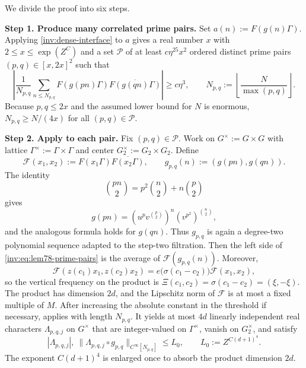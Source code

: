 \documentclass[twoside]{aomart}
\makeatletter
\theoremstyle{paperplain}
\theoremstyle{paperdefinition}
\renewenvironment{proof}[1][\proofname]{\par\pushQED{\qed}%
  \normalfont\topsep6\p@\@plus3\p@\relax\trivlist
  \item[\hskip\labelsep\itshape #1\@addpunct{.}]\ignorespaces
}{\popQED\endtrivlist\@endpefalse}
\numberwithin{equation}{section}
\makeatother
\begin{document}
\begin{proof}
We divide the proof into six steps.	
	
\par
\medskip
\noindent\textbf{Step 1. Produce many correlated prime pairs.}
Set $a(n):=F(g(n)\Gamma)$. Applying
\eqref{inv:dense-interface} to $a$ gives a real number $x$ with
$2\le x\le\exp(Z^C)$ and a set $\mathcal P$ of at least
$c\eta^{25}x^2$ ordered distinct prime pairs $(p,q)\in[x,2x]^2$ such that
\begin{equation}
 \left|\frac1{N_{p,q}}\sum_{n\le N_{p,q}}
 F(g(pn)\Gamma)\overline{F(g(qn)\Gamma)}\right|
 \ge c\eta^3,\qquad
 N_{p,q}:=\left\lfloor\frac{N}{\max(p,q)}\right\rfloor .
\label{inv:eq:lem78-prime-pairs}
\end{equation}
Because $p,q\le2x$ and the assumed lower bound for $N$ is enormous,
$N_{p,q}\ge N/(4x)$ for all $(p,q)\in\mathcal P$.

\par
\medskip
\noindent\textbf{Step 2. Apply  to each pair.}
Fix $(p,q)\in\mathcal P$. Work on
$G^\times:=G\times G$ with lattice
$\Gamma^\times:=\Gamma\times\Gamma$ and center
$G_2^\times:=G_2\times G_2$. Define
\[
 \mathcal F(x_1,x_2):=F(x_1\Gamma)\overline{F(x_2\Gamma)},
 \qquad
 g_{p,q}(n):=(g(pn),g(qn)).
\]
The identity
$$\binom{pn}{2}=p^2\binom n2+n\binom p2$$ gives
$$g(pn)=(u^pv^{\binom p2})^n(v^{p^2})^{\binom n2},$$
and the analogous formula holds for $g(qn)$. Thus $g_{p,q}$ is again
a degree-two polynomial sequence adapted to the step-two filtration.
Then the left side of \eqref{inv:eq:lem78-prime-pairs} is the average
of $\mathcal F(g_{p,q}(n))$. Moreover,
\[
 \mathcal F(z(c_1)x_1,z(c_2)x_2)
 =e\bigl(\sigma(c_1-c_2)\bigr)\mathcal F(x_1,x_2),
\]
so the vertical frequency on the product is
$\Xi(c_1,c_2)=\sigma(c_1-c_2)=(\xi,-\xi)$.
The product has dimension $2d$, and the Lipschitz norm of $\mathcal F$
is at most a fixed multiple of $M$. After increasing the absolute constant in the threshold if necessary,  applies with length $N_{p,q}$.
It yields at most $4d$ linearly independent real characters
$\Lambda_{p,q,j}$ on $G^\times$ that are integer-valued on
$\Gamma^\times$, vanish on $G_2^\times$, and satisfy
\begin{equation}
 |\Lambda_{p,q,j}|,\ 
 \|\Lambda_{p,q,j}\circ g_{p,q}\|_{C^\infty[N_{p,q}]}
 \le L_0,\qquad L_0:=Z^{C(d+1)^4}.
\label{inv:eq:lem78-product-bounds}
\end{equation}
The exponent $C(d+1)^4$ is enlarged once to absorb the product
dimension $2d$.


\end{proof}
\end{document}
